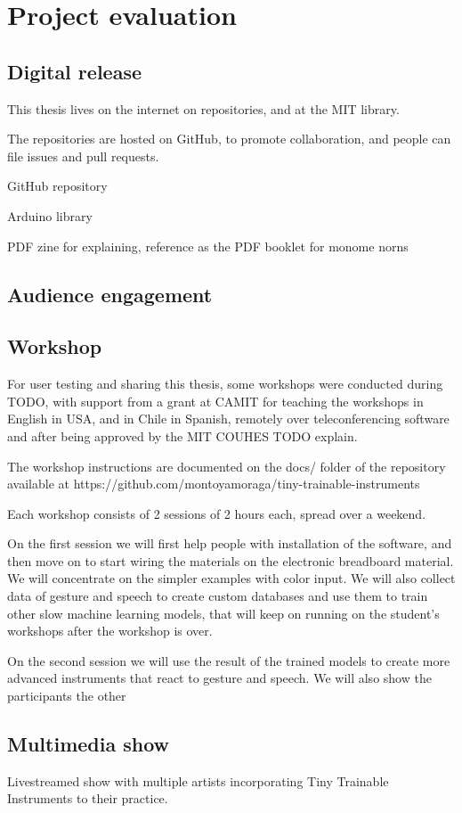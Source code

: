 \chapter{Project evaluation}

\section{Digital release}

This thesis lives on the internet on repositories, and at the MIT library. 

The repositories are hosted on GitHub, to promote collaboration, and people can file issues and pull requests.

GitHub repository

Arduino library


PDF zine for explaining, reference as the PDF booklet for monome norns

\section{Audience engagement}


\section{Workshop}

For user testing and sharing this thesis, some workshops were conducted during TODO, with support from a grant at CAMIT for teaching the workshops in English in USA, and in Chile in Spanish, remotely over teleconferencing software and after being approved by the MIT COUHES TODO explain.

The workshop instructions are documented on the docs/ folder of the repository available at https://github.com/montoyamoraga/tiny-trainable-instruments

Each workshop consists of 2 sessions of 2 hours each, spread over a weekend.

On the first session we will first help people with installation of the software, and then move on to start wiring the materials on the electronic breadboard material. We will concentrate on the simpler examples with color input. We will also collect data of gesture and speech to create custom databases and use them to train other slow machine learning models, that will keep on running on the student's workshops after the workshop is over.

On the second session we will use the result of the trained models to create more advanced instruments that react to gesture and speech. We will also show the participants the other 
 

\section{Multimedia show}

Livestreamed show with multiple artists incorporating Tiny Trainable Instruments to their practice.
